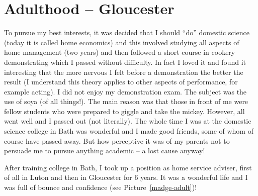 \chapter{Adulthood -- Gloucester}

To pursue my best interests, it was decided that I should ``do''
domestic science (today it is called home economics) and this involved
studying all aspects of home management (two years) and then followed
a short course in cookery demonstrating which I passed without
difficulty. In fact I loved it and found it interesting that the more
nervous I felt before a demonstration the better the result (I
understand this theory applies to other aspects of performance, for
example acting). I did not enjoy my demonstration exam. The subject
was the use of soya (of all things!). The main reason was that those
in front of me were fellow students who were prepared to giggle and
take the mickey. However, all went well and I passed out (not
literally). The whole time I was at the domestic science college in
Bath was wonderful and I made good friends, some of whom of course
have passed away. But how perceptive it was of my parents not to
persuade me to pursue anything academic -- a lost cause anyway!

After training college in Bath, I took up a position as home service
adviser, first of all in Luton and then in Gloucester for 6 years. It
was a wonderful life and I was full of bounce and confidence (see
Picture~\ref{madge-adult})!

